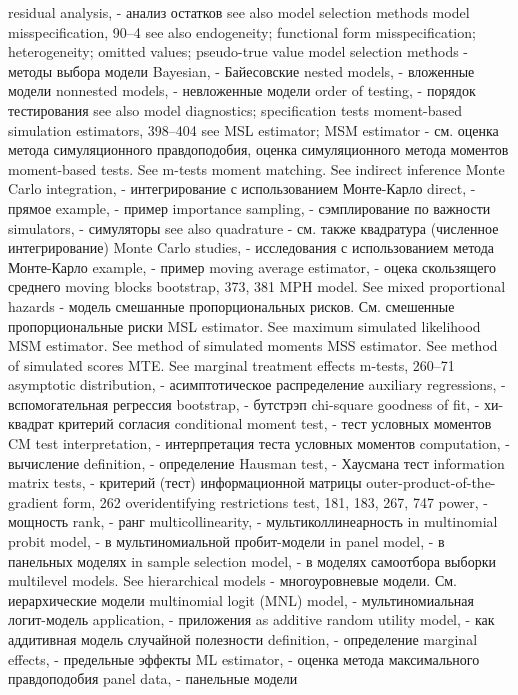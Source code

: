 residual analysis, - анализ остатков
see also model selection methods model misspecification, 90–4
see also endogeneity; functional form misspecification; heterogeneity; omitted values; pseudo-true value
model selection methods - методы выбора модели
Bayesian, - Байесовские
nested models, - вложенные модели 
nonnested models, - невложенные модели 
order of testing, - порядок тестирования
see also model diagnostics; specification tests moment-based simulation estimators,
398–404
see MSL estimator; MSM estimator - см. оценка метода симуляционного правдоподобия, оценка симуляционного метода моментов
moment-based tests. See m-tests moment matching. See indirect inference 
Monte Carlo integration, - интегрирование с использованием Монте-Карло
direct, - прямое
example, - пример
importance sampling, - сэмплирование по важности 
simulators, - симуляторы
see also quadrature - см. также квадратура (численное интегрирование)
Monte Carlo studies, - исследования с использованием метода Монте-Карло
example, - пример
moving average estimator, - оцека скользящего среднего
moving blocks bootstrap, 373, 381
MPH model. See mixed proportional hazards - модель смешанные пропорциональных рисков. См. смешенные пропорциональные риски
MSL estimator. See maximum simulated likelihood MSM estimator. See method of simulated moments MSS estimator. See method of simulated scores MTE. See marginal treatment effects
m-tests, 260–71
asymptotic distribution, - асимптотическое распределение
auxiliary regressions, - вспомогательная регрессия
bootstrap, - бутстрэп
chi-square goodness of fit, - хи-квадрат критерий согласия
conditional moment test, - тест условных моментов 
CM test interpretation, - интерпретация теста условных моментов
computation, - вычисление
definition, - определение
Hausman test, - Хаусмана тест
information matrix tests, - критерий (тест) информационной матрицы
outer-product-of-the-gradient form, 262 
overidentifying restrictions test, 181, 183, 267,
747 
power, - мощность
rank, - ранг
multicollinearity, - мультиколлинеарность
in multinomial probit model, - в мультиномиальной пробит-модели
in panel model, - в панельных моделях
in sample selection model, - в моделях самоотбора выборки
multilevel models. See hierarchical models - многоуровневые модели. См. иерархические модели
multinomial logit (MNL) model, - мультиномиальная логит-модель
application, - приложения
as additive random utility model, - как аддитивная модель случайной полезности
definition, - определение
marginal effects, - предельные эффекты
ML estimator, - оценка метода максимального правдоподобия
panel data, - панельные модели
